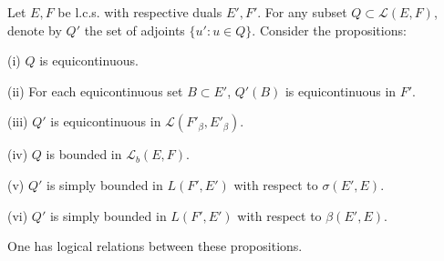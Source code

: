 Let $E, F$ be l.c.s. with respective duals $E', F'$. For any subset $Q \subset \mathcal{L}(E, F)$, denote by $Q'$ the set of adjoints $\{u' : u \in Q\}$. Consider the propositions:

(i) $Q$ is equicontinuous.

(ii) For each equicontinuous set $B \subset E'$, $Q'(B)$ is equicontinuous in $F'$.

(iii) $Q'$ is equicontinuous in $\mathcal{L}(F'_\beta, E'_\beta)$.

(iv) $Q$ is bounded in $\mathcal{L}_b(E, F)$.

(v) $Q'$ is simply bounded in $L(F', E')$ with respect to $\sigma(E', E)$.

(vi) $Q'$ is simply bounded in $L(F', E')$ with respect to $\beta(E', E)$.

One has logical relations between these propositions.
